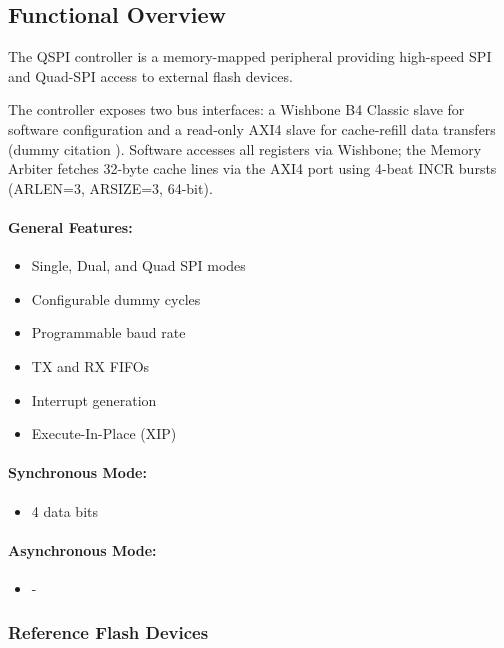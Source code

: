 \subsection{Functional Overview}
\label{subsec:qspifunc01}
The QSPI controller is a memory-mapped peripheral providing high-speed SPI and Quad-SPI access to external flash devices.

The controller exposes two bus interfaces: a Wishbone B4 Classic slave for software
configuration and a read-only AXI4 slave for cache-refill data transfers (dummy citation \cite{lehm}).
Software accesses all registers via Wishbone; the Memory Arbiter fetches 32-byte cache
lines via the AXI4 port using 4-beat INCR bursts (ARLEN=3, ARSIZE=3, 64-bit).

\paragraph{General Features: }
\begin{itemize}
  \item Single, Dual, and Quad SPI modes
  \item Configurable dummy cycles
  \item Programmable baud rate
  \item TX and RX FIFOs
  \item Interrupt generation
  \item Execute-In-Place (XIP)
\end{itemize}

\paragraph{Synchronous Mode: }
\begin{itemize}
  \item 4 data bits
\end{itemize}

\paragraph{Asynchronous Mode: }
\begin{itemize}
  \item -
\end{itemize}

\subsubsection{Reference Flash Devices}

